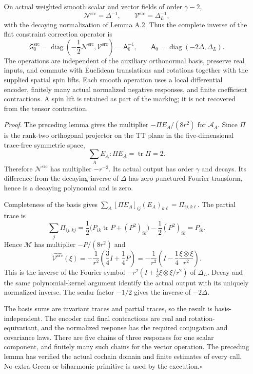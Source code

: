 \documentclass[
  english,
  11pt,
  reqno]{amsart}
\begin{document}
On actual weighted smooth scalar and vector fields of order
\(\gamma-2\), \[
\mathcal N^{\mathrm{src}}=\Delta^{-1},\qquad
\mathcal V^{\mathrm{src}}=\Delta_L^{-1},
\] with the decaying normalization of
\hyperref[lem:online-chart-decaying-flat-inverses]{Lemma A.2}. Thus the
complete inverse of the flat constraint correction operator is%
 \[
\mathsf G_0^{\mathrm{src}}
=\operatorname{diag}\left(-\frac12\mathcal N^{\mathrm{src}},
                          \mathcal V^{\mathrm{src}}\right)
=\mathsf A_0^{-1},\qquad
\mathsf A_0=\operatorname{diag}(-2\Delta,\Delta_L).
\] The operations are independent of the auxiliary orthonormal basis,
preserve real inputs, and commute with Euclidean translations and
rotations together with the supplied spatial spin lifts. Each smooth
operation uses a local differential encoder, finitely many actual
normalized negative responses, and finite coefficient contractions. A
spin lift is retained as part of the marking; it is not recovered from
the tensor contraction.

\emph{Proof.} The preceding lemma gives the multiplier
\(-\Pi E_A/(8r^2)\) for \(\mathcal A_A\). Since \(\Pi\) is the rank-two
orthogonal projector on the TT plane in the five-dimensional trace-free
symmetric space, \[
\sum_AE_A:\Pi E_A=\operatorname{tr}\Pi=2.
\] Therefore \(\mathcal N^{\mathrm{src}}\) has multiplier \(-r^{-2}\).
Its actual output has order \(\gamma\) and decays. Its difference from
the decaying inverse of \(\Delta\) has zero punctured Fourier transform,
hence is a decaying polynomial and is zero.

Completeness of the basis gives
\(\sum_A[\Pi E_A]_{ij}(E_A)_{k\ell}=\Pi_{ij,k\ell}\). The partial trace
is%
 \[
\sum_j\Pi_{ij,kj}
=\frac12\bigl(P_{ik}\operatorname{tr}P+(P^2)_{ik}\bigr)
 -\frac12(P^2)_{ik}
=P_{ik}.
\] Hence \(\mathcal M\) has multiplier \(-P/(8r^2)\) and \[
\widehat{\mathcal V^{\mathrm{src}}}(\xi)
=-\frac1{r^2}\left(\frac34I+\frac14P\right)
=-\frac1{r^2}\left(I-\frac14\frac{\xi\otimes\xi}{r^2}\right).
\] This is the inverse of the Fourier symbol
\(-r^2(I+\tfrac13\xi\otimes\xi/r^2)\) of \(\Delta_L\). Decay and the
same polynomial-kernel argument identify the actual output with its
uniquely normalized inverse. The scalar factor \(-1/2\) gives the
inverse of \(-2\Delta\).

The basis sums are invariant traces and partial traces, so the result is
basis-independent. The encoder and final contractions are real and
rotation-equivariant, and the normalized response has the required
conjugation and covariance laws. There are five chains of three
responses for one scalar component, and finitely many such chains for
the vector operation. The preceding lemma has verified the actual
cochain domain and finite estimates of every call. No extra Green or
biharmonic primitive is used by the execution.\nobreak\hfill\quad\(\square\)
\end{document}
